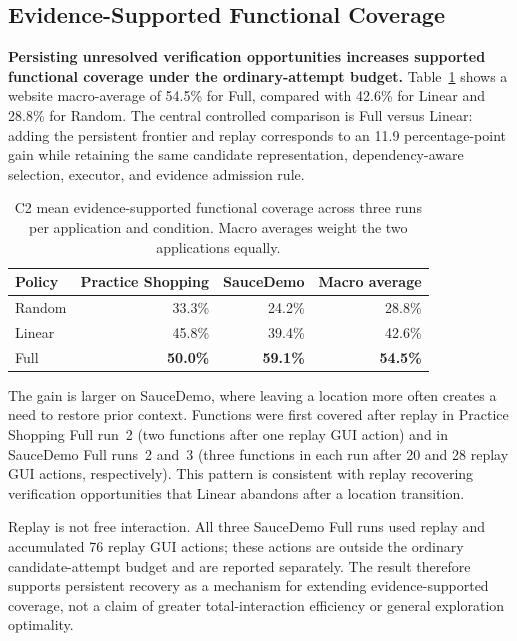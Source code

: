 \subsection{Evidence-Supported Functional Coverage}

\textbf{Persisting unresolved verification opportunities increases supported
functional coverage under the ordinary-attempt budget.} Table~\ref{tab:c2-coverage}
shows a website macro-average of 54.5\% for Full, compared with 42.6\% for
Linear and 28.8\% for Random. The central controlled comparison is Full versus
Linear: adding the persistent frontier and replay corresponds to an 11.9
percentage-point gain while retaining the same candidate representation,
dependency-aware selection, executor, and evidence admission rule.

\begin{table}[t]
    \centering
    \caption{C2 mean evidence-supported functional coverage across three runs
    per application and condition. Macro averages weight the two applications
    equally.}
    \label{tab:c2-coverage}
    \small
    \begin{tabular}{lrrr}
        \toprule
        Policy & Practice Shopping & SauceDemo & Macro average \\
        \midrule
        Random & 33.3\% & 24.2\% & 28.8\% \\
        Linear & 45.8\% & 39.4\% & 42.6\% \\
        Full & \textbf{50.0\%} & \textbf{59.1\%} & \textbf{54.5\%} \\
        \bottomrule
    \end{tabular}
\end{table}

The gain is larger on SauceDemo, where leaving a location more often creates a
need to restore prior context. Functions were first covered after replay in
Practice Shopping Full run~2 (two functions after one replay GUI action) and in
SauceDemo Full runs~2 and~3 (three functions in each run after 20 and 28 replay
GUI actions, respectively). This pattern is consistent with replay recovering
verification opportunities that Linear abandons after a location transition.

Replay is not free interaction. All three SauceDemo Full runs used replay and
accumulated 76 replay GUI actions; these actions are outside the ordinary
candidate-attempt budget and are reported separately. The result therefore
supports persistent recovery as a mechanism for extending evidence-supported
coverage, not a claim of greater total-interaction efficiency or general
exploration optimality.

